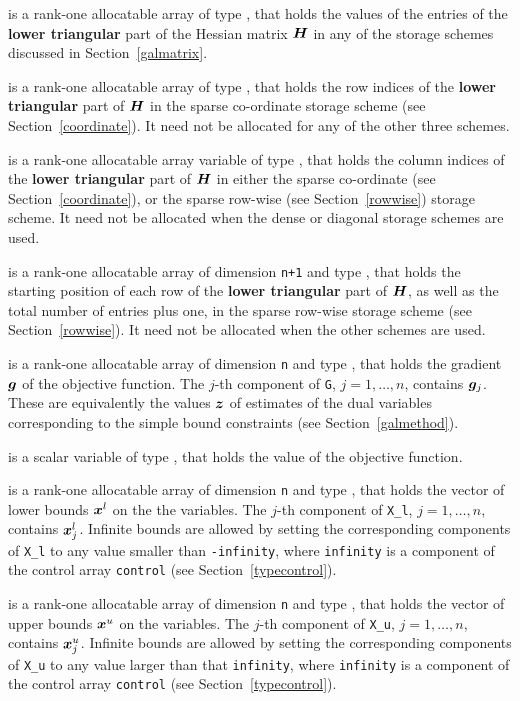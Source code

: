\documentclass{galahad}
\begin{document}
\begin{description}
\begin{description}
 is a rank-one allocatable array of type \realdp, that holds
the values of the entries of the {\bf lower triangular} part
of the Hessian matrix ${\bm{H}}$ in any of the
storage schemes discussed in Section~\ref{galmatrix}.

 is a rank-one allocatable array of type \integer,
that holds the row indices of the {\bf lower triangular} part of ${\bm{H}}$
in the sparse co-ordinate storage
scheme (see Section~\ref{coordinate}).
It need not be allocated for any of the other three schemes.

 is a rank-one allocatable array variable of type \integer,
that holds the column indices of the {\bf lower triangular} part of
${\bm{H}}$ in either the sparse co-ordinate
(see Section~\ref{coordinate}), or the sparse row-wise
(see Section~\ref{rowwise}) storage scheme.
It need not be allocated when the dense or diagonal storage schemes are used.

 is a rank-one allocatable array of dimension {\tt n+1} and type
\integer, that holds the starting position of
each row of the {\bf lower triangular} part of ${\bm{H}}$, as well
as the total number of entries plus one, in the sparse row-wise storage
scheme (see Section~\ref{rowwise}). It need not be allocated when the
other schemes are used.

\end{description}

 is a rank-one allocatable array of dimension {\tt n} and type
\realdp, that holds the gradient ${\bm{g}}$
of the objective function.
The $j$-th component of
{\tt G}, $j = 1,  \ldots ,  n$, contains ${\bm{g}}_{j}$.
These are equivalently the values ${\bm{z}}$ of estimates  of the dual variables
corresponding to the simple bound constraints (see Section~\ref{galmethod}).

 is a scalar variable of type
\realdp, that holds the value of the objective function.

 is a rank-one allocatable array of dimension {\tt n} and type
\realdp, that holds
the vector of lower bounds ${\bm{x}}^{l}$ on the the variables.
The $j$-th component of {\tt X\_l}, $j = 1, \ldots , n$,
contains ${\bm{x}}_{j}^{l}$.
Infinite bounds are allowed by setting the corresponding
components of {\tt X\_l} to any value smaller than {\tt -infinity},
where {\tt infinity} is a component of the control array {\tt control}
(see Section~\ref{typecontrol}).

 is a rank-one allocatable array of dimension {\tt n} and type
\realdp, that holds
the vector of upper bounds ${\bm{x}}^{u}$ on the variables.
The $j$-th component of {\tt X\_u}, $j = 1, \ldots , n$,
contains ${\bm{x}}_{j}^{u}$.
Infinite bounds are allowed by setting the corresponding
components of {\tt X\_u} to any value larger than that {\tt infinity},
where {\tt infinity} is a component of the control array {\tt control}
(see Section~\ref{typecontrol}).


\end{description}
\end{document}
